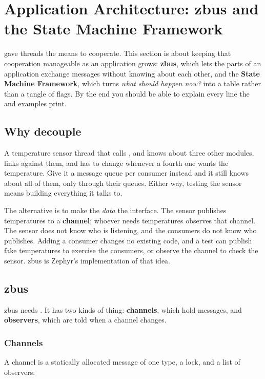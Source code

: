 
\section{Application Architecture: zbus and the State Machine Framework}
\label{c4:sec:applicationarchite}\label{c4:app:b}
 gave threads the means to cooperate. This section is about keeping that
cooperation manageable as an application grows: \textbf{zbus}, which lets the parts of an
application exchange messages without knowing about each other, and the \textbf{State Machine
Framework}, which turns \emph{what should happen now?} into a table rather than a tangle of flags.
By the end you should be able to explain every line the  and
 examples print.

\subsection{Why decouple}
A temperature sensor thread that calls ,  and
 knows about three other modules, links against them, and has to change
whenever a fourth one wants the temperature. Give it a message queue per consumer instead and it
still knows about all of them, only through their queues. Either way, testing the sensor means
building everything it talks to.

The alternative is to make the \emph{data} the interface. The sensor publishes temperatures to a
\textbf{channel}; whoever needs temperatures observes that channel. The sensor does not know who is
listening, and the consumers do not know who publishes. Adding a consumer changes no existing code,
and a test can publish fake temperatures to exercise the consumers, or observe the channel to check
the sensor. zbus is Zephyr’s implementation of that idea.

\subsection{zbus}
zbus needs . It has two kinds of thing: \textbf{channels}, which hold messages,
and \textbf{observers}, which are told when a channel changes.

\subsubsection{Channels}
A channel is a statically allocated message of one type, a lock, and a list of observers:


